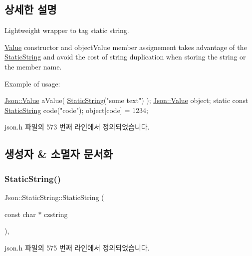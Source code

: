\subsection{상세한 설명}
Lightweight wrapper to tag static string. 

\hyperlink{class_json_1_1_value}{Value} constructor and object\+Value member assignement takes advantage of the \hyperlink{class_json_1_1_static_string}{Static\+String} and avoid the cost of string duplication when storing the string or the member name.

Example of usage\+: 
\begin{DoxyCode}
\hyperlink{class_json_1_1_value}{Json::Value} aValue( \hyperlink{class_json_1_1_static_string_afb6baf1ec078ce76f0b0f9b39d19437f}{StaticString}(\textcolor{stringliteral}{"some text"}) );
\hyperlink{class_json_1_1_value}{Json::Value} object;
\textcolor{keyword}{static} \textcolor{keyword}{const} \hyperlink{class_json_1_1_static_string_afb6baf1ec078ce76f0b0f9b39d19437f}{StaticString} code(\textcolor{stringliteral}{"code"});
\textcolor{keywordtype}{object}[code] = 1234;
\end{DoxyCode}
 

json.\+h 파일의 573 번째 라인에서 정의되었습니다.



\subsection{생성자 \& 소멸자 문서화}
\mbox{\label{class_json_1_1_static_string_afb6baf1ec078ce76f0b0f9b39d19437f}} 
\subsubsection{\texorpdfstring{Static\+String()}{StaticString()}}
{\footnotesize\ttfamily Json\+::\+Static\+String\+::\+Static\+String (\begin{DoxyParamCaption}\item[{const char $\ast$}]{czstring }\end{DoxyParamCaption})\hspace{0.3cm}{\ttfamily [inline]}, {\ttfamily [explicit]}}



json.\+h 파일의 575 번째 라인에서 정의되었습니다.


